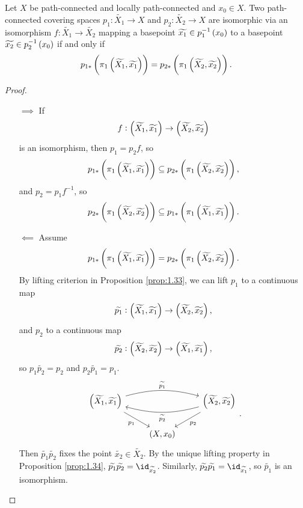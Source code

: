 \begin{proposition}
\label{prop:1.37}
Let $ X $ be path-connected and locally path-connected and $ x_0 \in X $. Two path-connected covering spaces $ p_1 : \widetilde{X_1} \to X $ and $ p_2 : \widetilde{X_2} \to X $ are isomorphic via an isomorphism $ f : \widetilde{X_1} \to \widetilde{X_2} $ mapping a basepoint $ \widetilde{x_1} \in p_1^{-1}\br{x_0} $ to a basepoint $ \widetilde{x_2} \in p_2^{-1}\br{x_0} $ if and only if
$$ p_{1*}\br{\pi_1\br{\widetilde{X_1}, \widetilde{x_1}}} = p_{2*}\br{\pi_1\br{\widetilde{X_2}, \widetilde{x_2}}}. $$
\end{proposition}

\begin{proof}
\hfill
\begin{itemize}
\item[$ \implies $] If
$$ f : \br{\widetilde{X_1}, \widetilde{x_1}} \to \br{\widetilde{X_2}, \widetilde{x_2}} $$
is an isomorphism, then $ p_1 = p_2f $, so
$$ p_{1*}\br{\pi_1\br{\widetilde{X_1}, \widetilde{x_1}}} \subseteq p_{2*}\br{\pi_1\br{\widetilde{X_2}, \widetilde{x_2}}}, $$
and $ p_2 = p_1f^{-1} $, so
$$ p_{2*}\br{\pi_1\br{\widetilde{X_2}, \widetilde{x_2}}} \subseteq p_{1*}\br{\pi_1\br{\widetilde{X_1}, \widetilde{x_1}}}. $$

\pagebreak

\item[$ \impliedby $] Assume
$$ p_{1*}\br{\pi_1\br{\widetilde{X_1}, \widetilde{x_1}}} = p_{2*}\br{\pi_1\br{\widetilde{X_2}, \widetilde{x_2}}}. $$
By lifting criterion in Proposition \ref{prop:1.33}, we can lift $ p_1 $ to a continuous map
$$ \widetilde{p_1} : \br{\widetilde{X_1}, \widetilde{x_1}} \to \br{\widetilde{X_2}, \widetilde{x_2}}, $$
and $ p_2 $ to a continuous map
$$ \widetilde{p_2} : \br{\widetilde{X_2}, \widetilde{x_2}} \to \br{\widetilde{X_1}, \widetilde{x_1}}, $$
so $ p_1\widetilde{p_2} = p_2 $ and $ p_2\widetilde{p_1} = p_1 $.
$$
\begin{tikzcd}
\br{\widetilde{X_1}, \widetilde{x_1}} \arrow[bend left=15]{rr}{\widetilde{p_1}} \arrow[swap]{dr}{p_1} & & \br{\widetilde{X_2}, \widetilde{x_2}} \arrow{dl}{p_2} \arrow[bend left=15]{ll}{\widetilde{p_2}} \\
& \br{X, x_0} &
\end{tikzcd}.
$$
Then $ \widetilde{p_1}\widetilde{p_2} $ fixes the point $ \widetilde{x_2} \in \widetilde{X_2} $. By the unique lifting property in Proposition \ref{prop:1.34}, $ \widetilde{p_1}\widetilde{p_2} = \id_{\widetilde{x_2}} $. Similarly, $ \widetilde{p_2}\widetilde{p_1} = \id_{\widetilde{x_1}} $, so $ \widetilde{p_1} $ is an isomorphism.
\end{itemize}
\end{proof}

